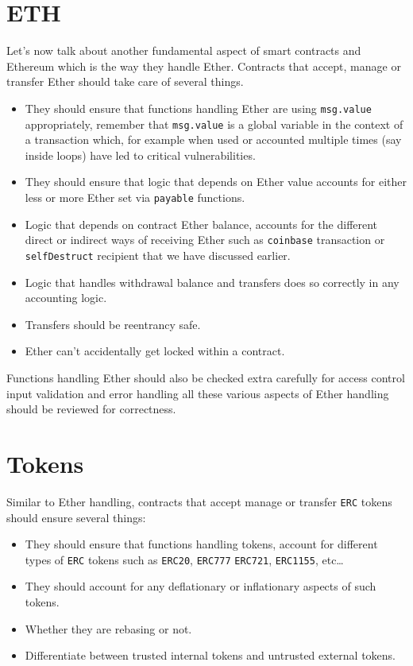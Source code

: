 \section{ETH}
Let's now talk about another fundamental aspect of smart contracts and Ethereum which is the way they handle Ether. Contracts that accept, manage or transfer Ether should take care of several things.
\begin{itemize}
\item They should ensure that functions handling Ether are using \verb|msg.value| appropriately, remember that \verb|msg.value| is a global variable in the context of a transaction which, for example when used or accounted multiple times (say inside loops) have led to critical vulnerabilities.
\item They should ensure that logic that depends on Ether value accounts for either less or more Ether set via \verb|payable| functions.
\item Logic that depends on contract Ether balance, accounts for the different direct or indirect ways of receiving Ether such as \verb|coinbase| transaction or \verb|selfDestruct| recipient that we have discussed earlier.
\item Logic that handles withdrawal balance and transfers does so correctly in any accounting logic.
\item Transfers should be reentrancy safe.
\item Ether can't accidentally get locked within a contract.
\end{itemize}

Functions handling Ether should also be checked extra carefully for access control input validation and error handling all these various aspects of Ether handling should be reviewed for correctness.

\section{Tokens}
Similar to Ether handling, contracts that accept manage or transfer \verb|ERC| tokens should ensure several things:
\begin{itemize}
\item They should ensure that functions handling tokens, account for different types of \verb|ERC| tokens such as \verb|ERC20|, \verb|ERC777| \verb|ERC721|, \verb|ERC1155|, etc\dots
\item They should account for any deflationary or inflationary aspects of such tokens.
\item Whether they are rebasing or not.
\item Differentiate between trusted internal tokens and untrusted external tokens.
\end{itemize}

